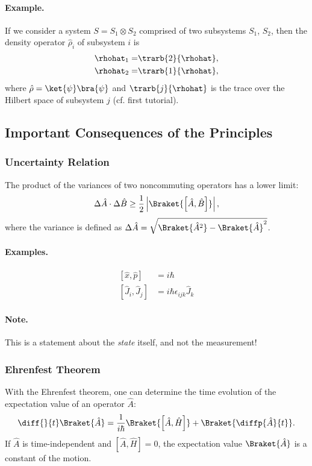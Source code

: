 				\paragraph{Example.} 
					If we consider a system $S = S_1 \otimes S_2$ comprised of two subsystems $S_1$, $S_2$, then the density operator $\hat{\rho}_i$ of  subsystem $i$ is
					\begin{align}
						\rhohat_1=&\trarb{2}{\rhohat},\\
						\rhohat_2=&\trarb{1}{\rhohat},
					\end{align}
					where $\hat{\rho}=\ket{\psi}\bra{\psi}$ and $\trarb{j}{\rhohat}$ is the trace over the Hilbert space of subsystem $j$ (cf. first tutorial).
		\subsection{Important Consequences of the Principles}

			\subsubsection{Uncertainty Relation}
				The product of the variances of two noncommuting operators has a lower limit:
				\begin{align}
					\Delta \hat{A} \cdot \Delta \hat{B} \geq \frac{1}{2} \left| \Braket{\left[\hat{A},\hat{B}\right]} \right|,
				\end{align}
				where the variance is defined as $\Delta \hat{A} = \sqrt{\Braket{\hat{A}^2}-\Braket{\hat{A}}^2}$.

				\paragraph{Examples.}
					\begin{align}
						\left[ \hat{x}, \hat{p} \right] &= i \hbar \\
						\left[ \hat{J}_i , \hat{J}_j \right] &= i \hbar \epsilon_{ijk} \hat{J}_k
					\end{align}
				\paragraph{Note.} This is a statement about the \emph{state} itself, and not the measurement!

			\subsubsection{Ehrenfest Theorem}
				With the Ehrenfest theorem, one can determine the time evolution of the expectation value of an operator $\hat{A}$:
				\begin{align}
					\diff{}{t}\Braket{\hat{A}}=\frac{1}{i\hbar}\Braket{\left[\hat{A},\hat{H}\right]}+\Braket{\diffp{\hat{A}}{t}}. \label{eq:ehrenfest}
				\end{align}
				If $\hat{A}$ is time-independent and $\left[\hat{A},\hat{H}\right]=0$, the expectation value $\Braket{\hat{A}}$ is a constant of the motion.

